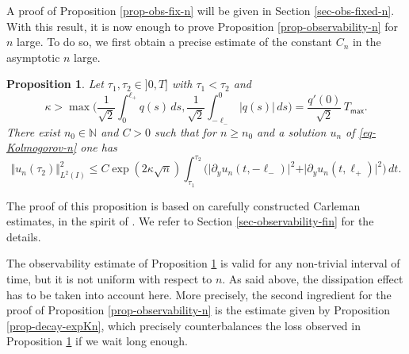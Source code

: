 \documentclass[10pt]{amsart}
\theoremstyle{plain}
\newtheorem{proposition}[theorem]{Proposition}
\theoremstyle{definition}
\newcommand{\nr}[1]{\Vert #1\Vert}
\newcommand{\1}{\mathds 1}
\newcommand{\N}{\mathbb{N}}
\newcommand{\Tmax}{T_{\mathsf{max}}}
\begin{document}
A proof of Proposition \ref{prop-obs-fix-n} will be given in Section \ref{sec-obs-fixed-n}. With this result, it is now enough to prove Proposition \ref{prop-observability-n} for $n$ large. To do so, we first obtain a precise estimate
of the constant $C_n$ in the asymptotic $n$ large.

\begin{proposition} \label{prop-obs-large-n}
Let $\tau_1,\tau_2 \in{}]0,T]$ with $\tau_1 < \tau_2$ and
\[
\kappa > \max \biggl(\frac 1 {\sqrt 2} \int_0^{\ell_+} q(s) \, ds , \frac 1 {\sqrt 2} \int_{-\ell_-}^{0} \vert q(s)\vert \, ds \biggr) = \frac {q'(0)}{\sqrt 2}\, \Tmax.
\]
There exist $n_0 \in \N$ and $C > 0$ such that for $n \geq n_0$ and a solution $u_n$ of \eqref{eq-Kolmogorov-n} one has
\[
\nr{u_n(\tau_2)}_{L^2(I)}^2 \leq C \exp(2 \kappa \sqrt{n}) {\int_{\tau_1}^{\tau_2} \bigl(\vert \partial_y u_n(t,-\ell_-)\vert^2 + \vert \partial_y u_n(t,\ell_+) \vert^2 \bigr) \, dt}.
\]
\end{proposition}

The proof of this proposition is based on carefully constructed Carleman estimates, in the spirit of \cite{Beauchard_Darde_Ervedoza}. We refer to Section \ref{sec-observability-fin} for the details.

The observability estimate of Proposition \ref{prop-obs-large-n} is valid for any non-trivial interval of time, but it is not uniform with respect to $n$. As said above, the dissipation effect has to be taken into account here. More precisely, the second ingredient for the proof of Proposition \ref{prop-observability-n} is the estimate given by Proposition \ref{prop-decay-expKn}, which precisely counterbalances the loss observed in Proposition \ref{prop-obs-large-n} if we wait long enough.
\end{document}
